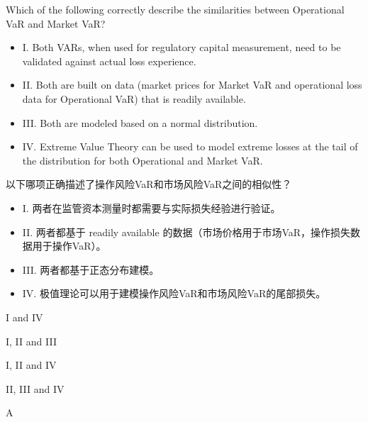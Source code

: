 \documentclass{article}
\newcounter{question} %
\begin{document}
\begin{question}
    Which of the following correctly describe the similarities between Operational VaR and Market VaR?
    \begin{itemize}
        \item I. Both VARs, when used for regulatory capital measurement, need to be validated against actual loss experience.
        \item II. Both are built on data (market prices for Market VaR and operational loss data for Operational VaR) that is readily available.
        \item III. Both are modeled based on a normal distribution.
        \item IV. Extreme Value Theory can be used to model extreme losses at the tail of the distribution for both Operational and Market VaR.
    \end{itemize}
    以下哪项正确描述了操作风险VaR和市场风险VaR之间的相似性？
    \begin{itemize}
        \item I. 两者在监管资本测量时都需要与实际损失经验进行验证。
        \item II. 两者都基于 readily available 的数据（市场价格用于市场VaR，操作损失数据用于操作VaR）。
        \item III. 两者都基于正态分布建模。
        \item IV. 极值理论可以用于建模操作风险VaR和市场风险VaR的尾部损失。
    \end{itemize}
    
\end{question}

\begin{choices}
    \item I and IV
    \item I, II and III
    \item I, II and IV
    \item II, III and IV
\end{choices}

\begin{correctanswer}
    A
\end{correctanswer}
\end{document}
